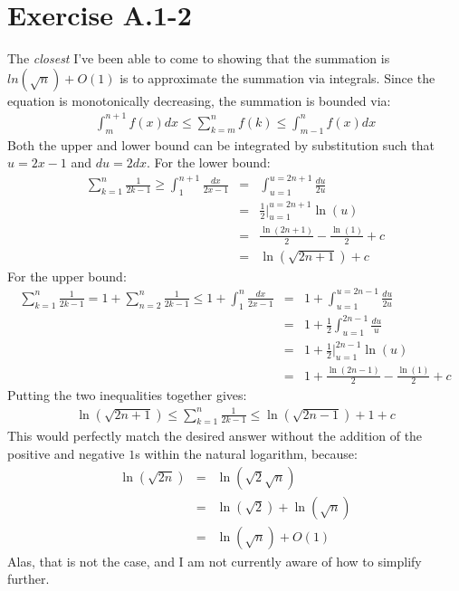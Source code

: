 \documentclass{article}
\begin{document}
\section*{Exercise A.1-2}

The \textit{closest} I've been able to come to showing that the summation is $ln(\sqrt{n}) + O(1)$ is to approximate the summation via integrals. Since the equation is monotonically decreasing, the summation is bounded via:
\begin{eqnarray*}
	\int_m^{n+1} f(x)dx \leq \sum_{k=m}^n f(k) \leq \int_{m-1}^n f(x)dx
\end{eqnarray*}
Both the upper and lower bound can be integrated by substitution such that $u=2x-1$ and $du=2dx$. For the lower bound:
\begin{eqnarray*}
	\sum_{k=1}^n \frac{1}{2k-1} \geq \int_1^{n+1} \frac{dx}{2x-1} & = & \int_{u=1}^{u=2n+1} \frac{du}{2u} \\
	& = & \frac{1}{2} \biggr\vert_{u=1}^{u=2n+1} \ln(u) \\
	& = & \frac{\ln(2n+1)}{2} - \frac{\ln(1)}{2} + c \\
	& = & \ln(\sqrt{2n+1}) + c
\end{eqnarray*}
For the upper bound:
\begin{eqnarray*}
	\sum_{k=1}^n \frac{1}{2k-1} = 1 + \sum_{n=2}^n \frac{1}{2k-1}\leq 1 + \int_1^n \frac{dx}{2x-1} & = & 1 + \int_{u=1}^{u=2n-1} \frac{du}{2u} \\
	& = & 1 + \frac{1}{2} \int_{u=1}^{2n-1} \frac{du}{u} \\
	& = & 1 + \frac{1}{2} \biggr\vert_{u=1}^{2n-1} \ln(u) \\
	& = & 1 + \frac{\ln(2n-1)}{2} - \frac{\ln(1)}{2} + c
\end{eqnarray*}
Putting the two inequalities together gives:
\begin{eqnarray*}
	\ln(\sqrt{2n+1}) \leq \sum_{k=1}^n \frac{1}{2k-1} \leq \ln(\sqrt{2n-1}) + 1 + c
\end{eqnarray*}
This would perfectly match the desired answer without the addition of the positive and negative $1$s within the natural logarithm, because:
\begin{eqnarray*}
	\ln(\sqrt{2n}) & = & \ln(\sqrt{2}\sqrt{n}) \\
	& = & \ln(\sqrt{2}) + \ln(\sqrt{n}) \\
	& = & \ln(\sqrt{n}) + O(1)
\end{eqnarray*}
Alas, that is not the case, and I am not currently aware of how to simplify further.
	
\end{document}
